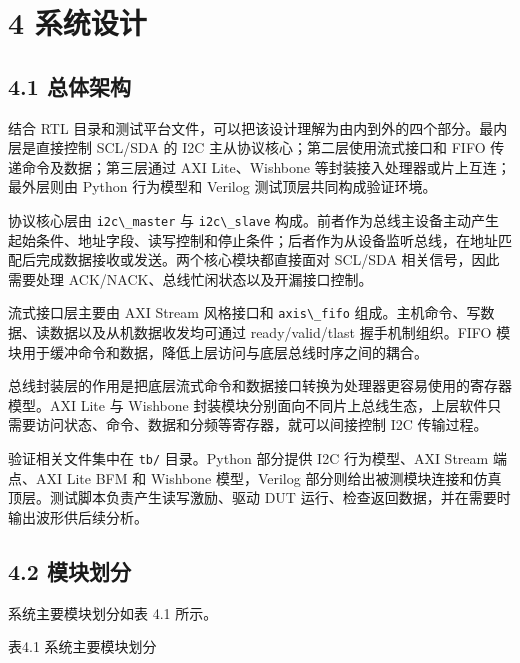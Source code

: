 \section{4 系统设计}\label{ux7cfbux7edfux8bbeux8ba1}

\subsection{4.1 总体架构}\label{ux603bux4f53ux67b6ux6784}

结合 RTL
目录和测试平台文件，可以把该设计理解为由内到外的四个部分。最内层是直接控制
SCL/SDA 的 I2C 主从协议核心；第二层使用流式接口和 FIFO
传递命令及数据；第三层通过 AXI Lite、Wishbone
等封装接入处理器或片上互连；最外层则由 Python 行为模型和 Verilog
测试顶层共同构成验证环境。

协议核心层由 \passthrough{\lstinline!i2c\_master!} 与
\passthrough{\lstinline!i2c\_slave!}
构成。前者作为总线主设备主动产生起始条件、地址字段、读写控制和停止条件；后者作为从设备监听总线，在地址匹配后完成数据接收或发送。两个核心模块都直接面对
SCL/SDA 相关信号，因此需要处理 ACK/NACK、总线忙闲状态以及开漏接口控制。

流式接口层主要由 AXI Stream 风格接口和
\passthrough{\lstinline!axis\_fifo!}
组成。主机命令、写数据、读数据以及从机数据收发均可通过 ready/valid/tlast
握手机制组织。FIFO
模块用于缓冲命令和数据，降低上层访问与底层总线时序之间的耦合。

总线封装层的作用是把底层流式命令和数据接口转换为处理器更容易使用的寄存器模型。AXI
Lite 与 Wishbone
封装模块分别面向不同片上总线生态，上层软件只需要访问状态、命令、数据和分频等寄存器，就可以间接控制
I2C 传输过程。

验证相关文件集中在 \passthrough{\lstinline!tb/!} 目录。Python 部分提供
I2C 行为模型、AXI Stream 端点、AXI Lite BFM 和 Wishbone 模型，Verilog
部分则给出被测模块连接和仿真顶层。测试脚本负责产生读写激励、驱动 DUT
运行、检查返回数据，并在需要时输出波形供后续分析。

\subsection{4.2 模块划分}\label{ux6a21ux5757ux5212ux5206}

系统主要模块划分如表 4.1 所示。

表4.1 系统主要模块划分

